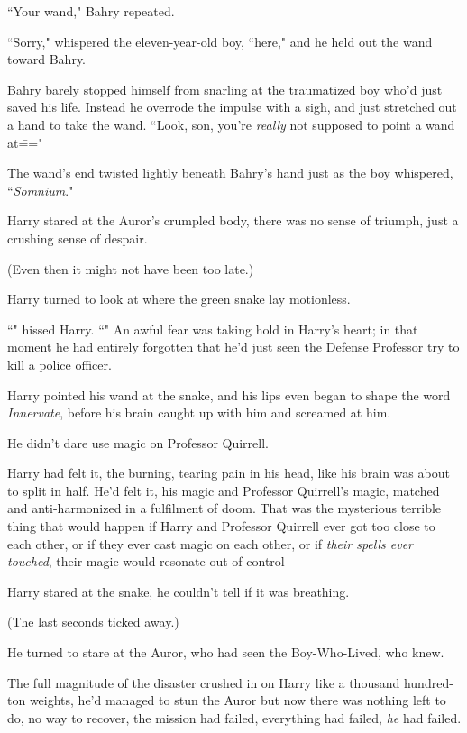 ``Your wand," Bahry repeated.

``Sorry," whispered the eleven-year-old boy, ``here," and he held out the wand toward Bahry.

Bahry barely stopped himself from snarling at the traumatized boy who'd just saved his life. Instead he overrode the impulse with a sigh, and just stretched out a hand to take the wand. ``Look, son, you're \emph{really} not supposed to point a wand at\==="

The wand's end twisted lightly beneath Bahry's hand just as the boy whispered, ``\emph{Somnium}."

\later

Harry stared at the Auror's crumpled body, there was no sense of triumph, just a crushing sense of despair.

(Even then it might not have been too late.)

Harry turned to look at where the green snake lay motionless.

``" hissed Harry. ``" An awful fear was taking hold in Harry's heart; in that moment he had entirely forgotten that he'd just seen the Defense Professor try to kill a police officer.

Harry pointed his wand at the snake, and his lips even began to shape the word \emph{Innervate}, before his brain caught up with him and screamed at him.

He didn't dare use magic on Professor Quirrell.

Harry had felt it, the burning, tearing pain in his head, like his brain was about to split in half. He'd felt it, his magic and Professor Quirrell's magic, matched and anti-harmonized in a fulfilment of doom. That was the mysterious terrible thing that would happen if Harry and Professor Quirrell ever got too close to each other, or if they ever cast magic on each other, or if \emph{their spells ever touched}, their magic would resonate out of control\---

Harry stared at the snake, he couldn't tell if it was breathing.

(The last seconds ticked away.)

He turned to stare at the Auror, who had seen the Boy-Who-Lived, who knew.

The full magnitude of the disaster crushed in on Harry like a thousand hundred-ton weights, he'd managed to stun the Auror but now there was nothing left to do, no way to recover, the mission had failed, everything had failed, \emph{he} had failed.


